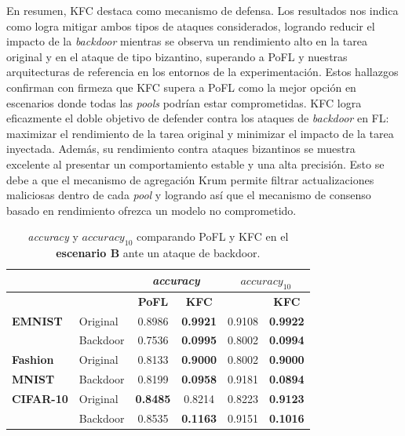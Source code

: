 En resumen, \ac{KFC} destaca como mecanismo de defensa. Los resultados nos indica como logra mitigar ambos tipos de ataques considerados, logrando reducir el impacto de la \textit{backdoor} mientras se observa un rendimiento alto en la tarea original y en el ataque de tipo bizantino, superando a \ac{PoFL} y nuestras arquitecturas de referencia en los entornos de la experimentación. Estos hallazgos confirman con firmeza que \ac{KFC} supera a \ac{PoFL} como la mejor opción en escenarios donde todas las \textit{pools} podrían estar comprometidas. \ac{KFC} logra eficazmente el doble objetivo de defender contra los ataques de \textit{backdoor} en \ac{FL}: maximizar el rendimiento de la tarea original y minimizar el impacto de la tarea inyectada. Además, su rendimiento contra ataques bizantinos se muestra excelente al presentar un comportamiento estable y una alta precisión. Esto se debe a que el mecanismo de agregación Krum permite filtrar actualizaciones maliciosas dentro de cada \textit{pool} y logrando así que el mecanismo de consenso basado en rendimiento ofrezca un modelo no comprometido.



\begin{table}
    \centering
    \begin{tabular}{llcccc}
    	\toprule
            &&\multicolumn{2}{c}{\textit{accuracy}}&  \multicolumn{2}{c}{\textit{$accuracy_{10}$}
}\\
\toprule
            &&\textbf{PoFL}    &  \textbf{KFC} &  & \textbf{KFC}
\\
\toprule
            \textbf{EMNIST}        &Original 
&0.8986  &  \textbf{0.9921}  &  0.9108 & \textbf{0.9922}    
\\
            &Backdoor 
&0.7536  &  \textbf{0.0995}   &  0.8002 & \textbf{0.0994}     
\\
\midrule
            \textbf{Fashion} &Original 
&0.8133 &  \textbf{0.9000}   &  0.8002 & \textbf{0.9000}    
\\
            \textbf{MNIST}  &Backdoor 
&0.8199  &  \textbf{0.0958}  &  0.9181 & \textbf{0.0894}    
\\
\midrule
            \textbf{CIFAR-10}      &Original 
&\textbf{0.8485}  &  0.8214  &  0.8223 & \textbf{0.9123}     
\\
            &Backdoor &0.8535  &  \textbf{0.1163}  &  0.9151 & \textbf{0.1016}    \\
\bottomrule
    \end{tabular}
     \caption{\textit{accuracy} y \textit{$accuracy_{10}$} comparando PoFL y KFC en el \textbf{escenario B} ante un ataque de backdoor.}
    \label{tab:kfcbackdoorb}
\end{table}

